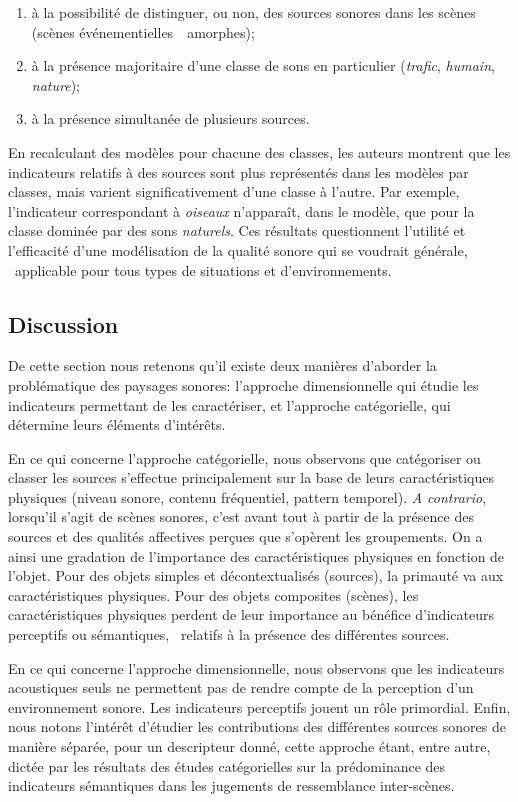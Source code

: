 \begin{enumerate}
\item à la possibilité de distinguer, ou non, des sources sonores dans les scènes (scènes événementielles~\vs~amorphes);
\item à la présence majoritaire d'une classe de sons en particulier (\emph{trafic}, \emph{humain}, \emph{nature});
\item à la présence simultanée de plusieurs sources.
\end{enumerate}

En recalculant des modèles pour chacune des classes, les auteurs montrent que les indicateurs relatifs à des sources sont plus représentés dans les modèles par classes, mais varient significativement d'une classe à l'autre. Par exemple, l'indicateur correspondant à \emph{oiseaux} n'apparaît, dans le modèle, que pour la classe dominée par des sons \emph{naturels}. Ces résultats questionnent l'utilité et l'efficacité d'une modélisation de la qualité sonore qui se voudrait générale, \ie~applicable pour tous types de situations et d'environnements.

\subsection{Discussion}
\label{sec:ch3_soundscapeDiscussion}

De cette section nous retenons qu'il existe deux manières d'aborder la problématique des paysages sonores: l'approche dimensionnelle qui étudie les indicateurs permettant de les caractériser, et l'approche catégorielle, qui détermine leurs éléments d'intérêts.

En ce qui concerne l'approche catégorielle, nous observons que catégoriser ou classer les sources s'effectue principalement sur la base de leurs caractéristiques physiques (niveau sonore, contenu fréquentiel, pattern temporel). \emph{A contrario}, lorsqu'il s'agit de scènes sonores, c'est avant tout à partir de la présence des sources et des qualités affectives perçues que s'opèrent les groupements. On a ainsi une gradation de l'importance des caractéristiques physiques en fonction de l'objet. Pour des objets simples et décontextualisés (sources), la primauté va aux caractéristiques physiques. Pour des objets composites (scènes), les caractéristiques physiques perdent de leur importance au bénéfice d'indicateurs perceptifs ou sémantiques, \ie~relatifs à la présence des différentes sources.

En ce qui concerne l'approche dimensionnelle, nous observons que les indicateurs acoustiques seuls ne permettent pas de rendre compte de la perception d'un environnement sonore. Les indicateurs perceptifs jouent un rôle primordial. Enfin, nous notons l'intérêt d'étudier les contributions des différentes sources sonores de manière séparée, pour un descripteur donné, cette approche étant, entre autre, dictée par les résultats des études catégorielles sur la prédominance des indicateurs sémantiques dans les jugements de ressemblance inter-scènes.

